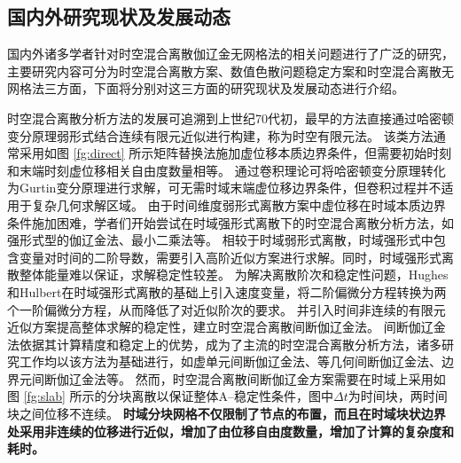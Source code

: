 \subsection{国内外研究现状及发展动态}

国内外诸多学者针对时空混合离散伽辽金无网格法的相关问题进行了广泛的研究，主要研究内容可分为时空混合离散方案、数值色散问题稳定方案和时空混合离散无网格法三方面，下面将分别对这三方面的研究现状及发展动态进行介绍。

时空混合离散分析方法的发展可追溯到上世纪70代初\cite{argyris1969a}，最早的方法直接通过哈密顿变分原理弱形式结合连续有限元近似进行构建，称为时空有限元法。
该类方法通常采用如图 \ref{fg:direct} 所示矩阵替换法施加虚位移本质边界条件，但需要初始时刻和末端时刻虚位移相关自由度数量相等。
通过卷积理论可将哈密顿变分原理转化为Gurtin变分原理进行求解，可无需时域末端虚位移边界条件\cite{Peng1992}，但卷积过程并不适用于复杂几何求解区域。
由于时间维度弱形式离散方案中虚位移在时域本质边界条件施加困难，学者们开始尝试在时域强形式离散下的时空混合离散分析方法，如强形式型的伽辽金法\cite{Li2017a}、最小二乘法\cite{epstein2024}等。
相较于时域弱形式离散，时域强形式中包含变量对时间的二阶导数，需要引入高阶近似方案进行求解。同时，时域强形式离散整体能量难以保证，求解稳定性较差。
为解决离散阶次和稳定性问题，Hughes和Hulbert\cite{hughes1988,hulbert1990}在时域强形式离散的基础上引入速度变量，将二阶偏微分方程转换为两个一阶偏微分方程，从而降低了对近似阶次的要求。
并引入时间非连续的有限元近似方案提高整体求解的稳定性，建立时空混合离散间断伽辽金法。
间断伽辽金法依据其计算精度和稳定上的优势，成为了主流的时空混合离散分析方法，诸多研究工作均以该方法为基础进行，如虚单元间断伽辽金法\cite{xu2025}、等几何间断伽辽金法\cite{lejeunes2024}、边界元间断伽辽金法\cite{hoonhout2023}等。
然而，时空混合离散间断伽辽金方案需要在时域上采用如图 \ref{fg:slab} 所示的分块离散以保证整体A--稳定性条件\cite{hughes1988}，图中$\Delta t$为时间块，两时间块之间位移不连续。
\textbf{时域分块网格不仅限制了节点的布置，而且在时域块状边界处采用非连续的位移进行近似，增加了由位移自由度数量，增加了计算的复杂度和耗时。}

